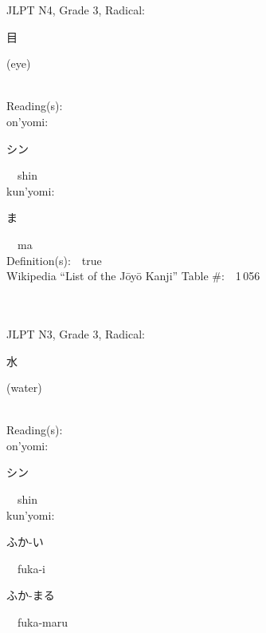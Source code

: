 \begin{multicols}{2}
{JLPT N4, Grade 3, Radical:\ \ {\begin{CJK}{UTF8}{min} 目 \end{CJK}} (eye) } \\
Reading(s):\ \ \\
{\hspace*{1em}}on'yomi:\ \ \\
{\hspace*{2em}}{\begin{CJK}{UTF8}{min} シン \end{CJK}}\ \ shin\ \ \\
{\hspace*{1em}}kun'yomi:\ \ \\
{\hspace*{2em}}{\begin{CJK}{UTF8}{min} ま \end{CJK}}\ \ ma\ \ \\
Definition(s):\ \ true \\
Wikipedia ``List of the J\=oy\=o Kanji'' Table \#:\ \ 1\,056 \\
\ \ \\
{\fontsize{34pt}{40pt}  }\ \ \\  %
{JLPT N3, Grade 3, Radical:\ \ {\begin{CJK}{UTF8}{min} 水 \end{CJK}} (water) } \\
Reading(s):\ \ \\
{\hspace*{1em}}on'yomi:\ \ \\
{\hspace*{2em}}{\begin{CJK}{UTF8}{min} シン \end{CJK}}\ \ shin\ \ \\
{\hspace*{1em}}kun'yomi:\ \ \\
{\hspace*{2em}}{\begin{CJK}{UTF8}{min} ふか-い \end{CJK}}\ \ fuka-i\ \ \\
{\hspace*{2em}}{\begin{CJK}{UTF8}{min} ふか-まる \end{CJK}}\ \ fuka-maru\ \ \\

\end{multicols}
